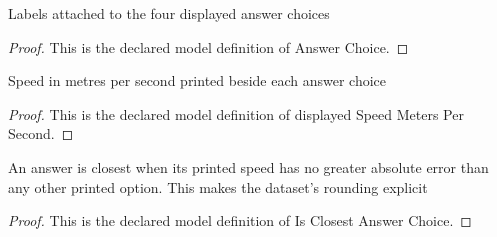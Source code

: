 \begin{definition}
  \label{def:physics:phyx-mini-0812:phyxminiproblems-problemphyxmini0812-answerchoice}
  Labels attached to the four displayed answer choices
\end{definition}
\begin{proof}
  This is the declared model definition of Answer Choice.
\end{proof}
\begin{definition}
  \label{def:physics:phyx-mini-0812:phyxminiproblems-problemphyxmini0812-answerchoice-displayedspeedmeterspersecond}
  Speed in metres per second printed beside each answer choice
\end{definition}
\begin{proof}
  This is the declared model definition of displayed Speed Meters Per Second.
\end{proof}
\begin{definition}
  \label{def:physics:phyx-mini-0812:phyxminiproblems-problemphyxmini0812-isclosestanswerchoice}
  An answer is closest when its printed speed has no greater absolute error than any other printed option. This makes the dataset's rounding explicit
\end{definition}
\begin{proof}
  This is the declared model definition of Is Closest Answer Choice.
\end{proof}
